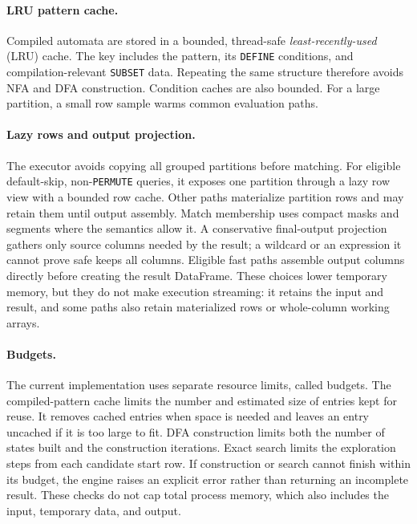 \paragraph{LRU pattern cache.}
Compiled automata are stored in a bounded, thread-safe
\emph{least-recently-used} (LRU) cache.  The key includes the pattern,
its \texttt{DEFINE} conditions, and compilation-relevant
\texttt{SUBSET} data.  Repeating the same structure therefore avoids
NFA and DFA construction.  Condition caches are also bounded.  For a
large partition, a small row sample warms common evaluation paths.

\paragraph{Lazy rows and output projection.}
The executor avoids copying all grouped partitions before matching.
For eligible default-skip, non-\texttt{PERMUTE} queries, it exposes one
partition through a lazy row view with a bounded row cache.  Other
paths materialize partition rows and may retain them until output
assembly.  Match membership uses compact masks and segments where the
semantics allow it.  A conservative
final-output projection gathers only source columns needed by the
result; a wildcard or an expression it cannot prove safe keeps all
columns.  Eligible fast paths assemble
output columns directly before creating the result DataFrame.  These
choices lower temporary memory, but they do not make execution
streaming: it retains the input and result, and some paths also retain
materialized rows or whole-column working arrays.

\paragraph{Budgets.}
The current implementation uses separate resource limits, called
budgets.  The compiled-pattern cache limits the number and estimated
size of entries kept for reuse.  It removes cached entries when space
is needed and leaves an entry uncached if it is too large to fit.
DFA construction limits both the number of states built and the
construction iterations.  Exact search limits the exploration steps
from each candidate start row.  If construction or search cannot finish
within its budget, the engine raises an explicit error rather than
returning an incomplete result.  These checks do not cap total process
memory, which also includes the input, temporary data, and output.


